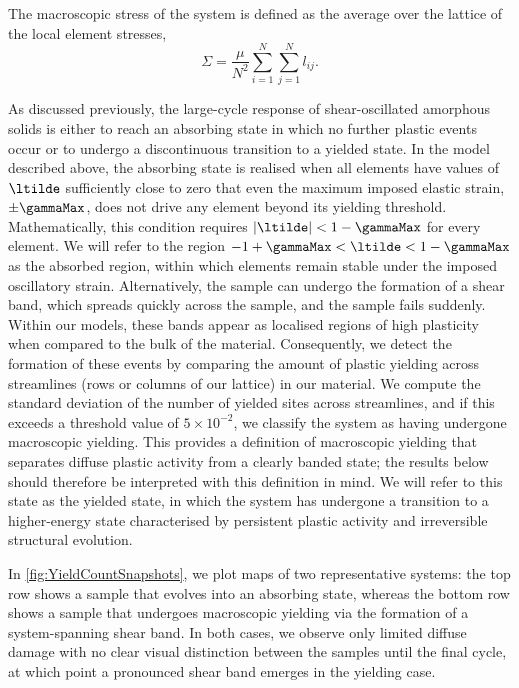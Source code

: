 \documentclass[asymmetricmargins]{library/duthesis}%
\begin{document}
The macroscopic stress of the system is defined as the average over the lattice of the local element stresses,
\begin{equation}
    \Sigma = \frac{\mu}{N^2}\sum_{i=1}^{N}\sum_{j=1}^{N} l_{ij}.
\end{equation}

As discussed previously, the large-cycle response of shear-oscillated amorphous solids is either to reach an absorbing state in which no further plastic events occur or to undergo a discontinuous transition to a yielded state. In the model described above, the absorbing state is realised when all elements have values of $\ltilde$ sufficiently close to zero that even the maximum imposed elastic strain, $\pm\gammaMax$, does not drive any element beyond its yielding threshold. Mathematically, this condition requires $|\ltilde|<1-\gammaMax$
for every element. We will refer to the region $-1+\gammaMax < \ltilde < 1-\gammaMax$ as the absorbed region, within which elements remain stable under the imposed oscillatory strain. Alternatively, the sample can undergo the formation of a shear band, which spreads quickly across the sample, and the sample fails suddenly. Within our models, these bands appear as localised regions of high plasticity when compared to the bulk of the material. Consequently, we detect the formation of these events by comparing the amount of plastic yielding across streamlines (rows or columns of our lattice) in our material. We compute the standard deviation of the number of yielded sites across streamlines, and if this exceeds a threshold value of $5 \times 10^{-2}$, we classify the system as having undergone macroscopic yielding. This provides a definition of macroscopic yielding that separates diffuse plastic activity from a clearly banded state; the results below should therefore be interpreted with this definition in mind. We will refer to this state as the yielded state, in which the system has undergone a transition to a higher-energy state characterised by persistent plastic activity and irreversible structural evolution. 

In \cref{fig:YieldCountSnapshots}, we plot maps of two representative systems: the top row shows a sample that evolves into an absorbing state, whereas the bottom row shows a sample that undergoes macroscopic yielding via the formation of a system-spanning shear band. In both cases, we observe only limited diffuse damage with no clear visual distinction between the samples until the final cycle, at which point a pronounced shear band emerges in the yielding case.
\end{document}
